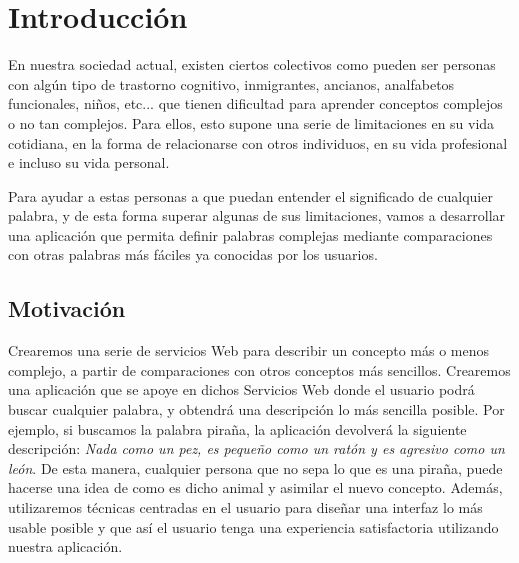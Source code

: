 \chapter{Introducción}
\label{cap:introduccion}


En nuestra sociedad actual, existen ciertos colectivos como pueden ser personas con algún tipo de trastorno cognitivo, inmigrantes, ancianos,  analfabetos funcionales, niños, etc... que tienen dificultad para aprender conceptos complejos o no tan complejos. Para ellos, esto supone una serie de limitaciones en su vida cotidiana, en la forma de relacionarse con otros individuos, en su vida profesional e incluso su vida personal.

Para ayudar a estas personas a que puedan entender el significado de cualquier palabra, y de esta forma superar algunas de sus limitaciones, vamos a desarrollar una aplicación que permita definir palabras complejas mediante comparaciones con otras palabras más fáciles ya conocidas por los usuarios. 

\section{Motivación}
Crearemos una serie de servicios Web para describir un concepto más o menos complejo, a partir de comparaciones con otros conceptos más sencillos. Crearemos una aplicación que se apoye en dichos Servicios Web donde el usuario podrá buscar cualquier palabra, y obtendrá una descripción lo más sencilla posible. Por ejemplo, si buscamos la palabra piraña, la aplicación devolverá la siguiente descripción:  \textit{Nada como un pez, es pequeño como un ratón y es agresivo como un león}. De esta manera, cualquier persona que no sepa lo que es una piraña, puede hacerse una idea de como es dicho animal y asimilar el nuevo concepto. Además, utilizaremos técnicas centradas en el usuario para diseñar una interfaz lo más usable posible y que así el usuario tenga una experiencia satisfactoria utilizando nuestra aplicación.


